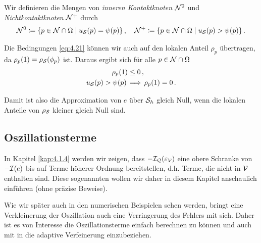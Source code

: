\begin{defi}\label{def:4.16}
Wir definieren die Mengen von  \textit{inneren Kontaktknoten} $\mathcal N^0$ und \textit{Nichtkontaktknoten} $\mathcal N^+$ durch
\begin{align*}
	\mathcal N^0 \coloneqq  \{p \in \mathcal N \cap \Omega \mid u_{\mathcal S}(p) = \psi (p) \} \, , \quad 
	\mathcal N^+ \coloneqq  \{p \in \mathcal N \cap \Omega \mid u_{\mathcal S}(p) > \psi (p) \}\, .
\end{align*}
\end{defi}


\begin{bem}\label{bem:4.17}
Die Bedingungen \eqref{eq:4.21} können wir auch auf den lokalen Anteil $\rho_p$ übertragen, da $\rho_p (1) = \rho_{\mathcal S} (\phi_p)$ ist. Daraus ergibt sich für alle $p \in \mathcal N \cap \Omega$
\begin{subequations}\label{eq:4.22}
\begin{align}\label{eq:4.22a}
	\rho_p(1) &  \le 0\, ,  \\
	\label{eq:4.22b}
	u_{\mathcal S} (p) > \psi (p) \, & \Longrightarrow \, \rho_p(1) =0 \, .
\end{align}
\end{subequations}
\end{bem}


Damit ist also die Approximation von $e$ über $\mathcal S_h$ gleich Null, wenn die lokalen Anteile von $\rho_{\mathcal S}$ kleiner gleich Null sind. 





\subsection{Oszillationsterme}
\label{kap:4.1.3}

In Kapitel \ref{kap:4.1.4} werden wir zeigen, dass $-\mathcal I_{\mathcal Q} (\varepsilon_{\mathcal V})$ eine obere Schranke von $-\mathcal I (e)$ bis auf Terme höherer Ordnung bereitstellen, d.h. Terme, die nicht in $\mathcal V$ enthalten sind. Diese sogenannten \textit{} wollen wir daher in diesem Kapitel anschaulich einführen (ohne präzise Beweise). 

Wie wir später auch in den numerischen Beispielen sehen werden, bringt eine Verkleinerung der Oszillation auch eine Verringerung des Fehlers mit sich. Daher ist es von Interesse die Oszillationsterme einfach berechnen zu können und auch mit in die adaptive Verfeinerung einzubeziehen.

